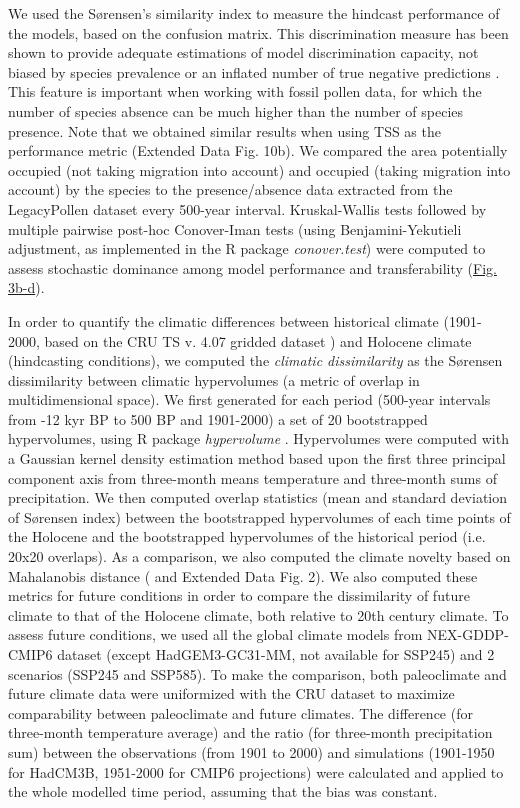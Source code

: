 \documentclass[pdflatex, sn-nature]{sn-jnl}%
\begin{document}
We used the Sørensen's similarity index to measure the hindcast performance of the models, based on the confusion matrix. This discrimination measure has been shown to provide adequate estimations of model discrimination capacity,  not biased by species prevalence or an inflated number of true negative predictions \cite{Leroy2018}. This feature is important when working with fossil pollen data, for which the number of species absence can be much higher than the number of species presence. Note that we obtained similar results when using TSS as the performance metric (Extended Data Fig. 10b). We compared the area potentially occupied (not taking migration into account) and occupied (taking migration into account) by the species to the presence/absence data extracted from the LegacyPollen dataset every 500-year interval. Kruskal-Wallis tests followed by multiple pairwise post-hoc Conover-Iman tests (using Benjamini-Yekutieli adjustment, as implemented in the R package \emph{conover.test}) were computed to assess stochastic dominance among model performance and transferability (\hyperref[past_performance]{Fig. 3b-d}).

In order to quantify the climatic differences between  historical climate (1901-2000, based on the CRU TS v. 4.07 gridded dataset \citep{Harris2020}) and Holocene climate (hindcasting conditions), we computed the \emph{climatic dissimilarity} as the Sørensen dissimilarity between climatic hypervolumes (a metric of overlap in multidimensional space). We first generated for each period (500-year intervals from -12 kyr BP to 500 BP and 1901-2000) a set of 20 bootstrapped hypervolumes, using R package \emph{hypervolume} \cite{Blonder2018}. Hypervolumes were computed with a Gaussian kernel density estimation method based upon the first three principal component axis from three-month means temperature and three-month sums of precipitation. We then computed overlap statistics (mean and standard deviation of Sørensen index) between the bootstrapped hypervolumes of each time points of the Holocene and the bootstrapped hypervolumes of the historical period (i.e. 20x20 overlaps). As a comparison, we also computed the climate novelty based on Mahalanobis distance (\citep{Burke2019} and Extended Data Fig. 2). 
We also computed these metrics for future conditions in order to compare the dissimilarity of future climate to that of  the Holocene climate, both relative to 20th century climate. To assess future conditions, we used all the global climate models from NEX-GDDP-CMIP6 dataset \citep{Thrasher2022} (except HadGEM3-GC31-MM, not available for SSP245) and 2 scenarios (SSP245 and SSP585). To make the comparison, both paleoclimate and future climate data were uniformized with the CRU dataset to maximize comparability between paleoclimate and future climates. The difference (for three-month temperature average) and the ratio (for three-month precipitation sum) between the observations (from 1901 to 2000) and simulations (1901-1950 for HadCM3B, 1951-2000 for CMIP6 projections) were calculated and applied to the whole modelled time period, assuming that the bias was constant. 
\end{document}
